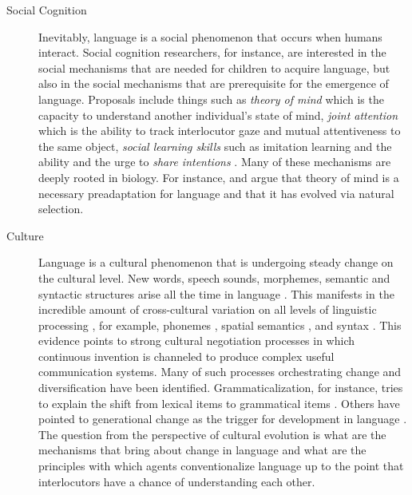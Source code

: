 \begin{description}
\item[Social Cognition] Inevitably, language is a social phenomenon that
occurs when humans interact. Social cognition researchers, for instance, 
are interested in the social mechanisms that are needed for children to acquire 
language, but also in the social mechanisms that are prerequisite for the emergence of language.
Proposals include things such as \emph{theory of mind} \citep{dunbar1998theory} which
is the capacity to understand another individual's state of mind, 
\emph{joint attention} \citep{carpenter1998social}
which is the ability to track interlocutor gaze and mutual 
attentiveness to the same object, \emph{social learning skills} such as imitation learning 
\citep{tomasello1992social} and the ability and the urge to \emph{share intentions} 
\citep{tomasello2005understanding}. Many of these mechanisms are deeply rooted in biology.
For instance, \cite{dunbar2003social} and \cite{worden1998evolution} argue that
theory of mind is a necessary preadaptation for language and that it has 
evolved via natural selection.

\item[Culture] Language is a cultural phenomenon that is undergoing 
steady change on the cultural level. New words, speech sounds, morphemes,
semantic and syntactic structures arise all the time in language \citep{steels2011self-organization}.
This manifests in the incredible amount of cross-cultural variation
on all levels of linguistic processing \citep{evans2009universals}, for example, phonemes 
\citep{maddieson1984patterns,oudeyer2005self}, spatial semantics \citep{levinson2003space},
and syntax \citep{levinson2006grammars}. 
This evidence points to strong cultural negotiation processes in which continuous invention 
is channeled to produce complex useful communication systems.
Many of such processes orchestrating change and diversification have been identified.
Grammaticalization, for instance, tries to explain the shift from
lexical items to grammatical items \citep{hopper2003grammaticalization}.
Others have pointed to generational change as the trigger for 
development in language \citep{smith2003iterated}.
The question from the perspective of cultural evolution is what are the mechanisms 
that bring about change in language and what are the principles with
which agents conventionalize language up to the point that interlocutors 
have a chance of understanding each other.
\end{description}


